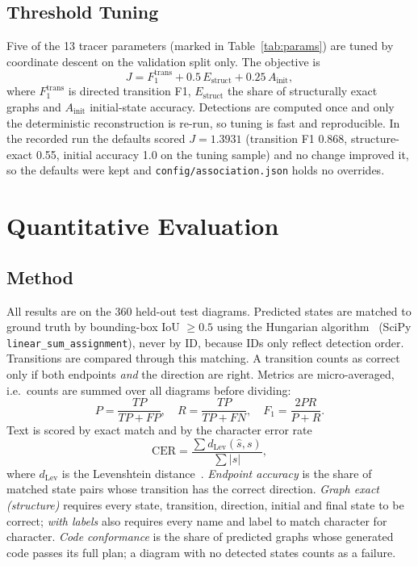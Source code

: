 \documentclass[journal,10pt]{IEEEtran}
\newcommand{\code}[1]{\texttt{#1}}
\begin{document}
\subsection{Threshold Tuning}
Five of the 13 tracer parameters (marked in Table~\ref{tab:params}) are tuned by coordinate
descent on the validation split only. The objective is
\begin{equation}
J = F_1^{\text{trans}} + 0.5\,E_{\text{struct}} + 0.25\,A_{\text{init}},
\end{equation}
where $F_1^{\text{trans}}$ is directed transition F1, $E_{\text{struct}}$ the share of
structurally exact graphs and $A_{\text{init}}$ initial-state accuracy. Detections are
computed once and only the deterministic reconstruction is re-run, so tuning is fast and
reproducible. In the recorded run the defaults scored $J=1.3931$ (transition F1 0.868,
structure-exact 0.55, initial accuracy 1.0 on the tuning sample) and no change improved
it, so the defaults were kept and \code{config/association.json} holds no overrides.

\section{Quantitative Evaluation}
\label{sec:results}

\subsection{Method}
All results are on the 360 held-out test diagrams. Predicted states are matched to ground
truth by bounding-box IoU $\ge 0.5$ using the Hungarian algorithm~\cite{kuhn} (SciPy
\code{linear\_sum\_assignment}), never by ID, because IDs only reflect detection order.
Transitions are compared through this matching. A transition counts as correct only if
both endpoints \emph{and} the direction are right. Metrics are micro-averaged, i.e.\
counts are summed over all diagrams before dividing:
\begin{equation}
P=\frac{TP}{TP+FP},\quad R=\frac{TP}{TP+FN},\quad F_1=\frac{2PR}{P+R}.
\end{equation}
Text is scored by exact match and by the character error rate
\begin{equation}
\text{CER}=\frac{\sum d_{\text{Lev}}(\hat{s}, s)}{\sum |s|},
\end{equation}
where $d_{\text{Lev}}$ is the Levenshtein distance~\cite{levenshtein}. \emph{Endpoint
accuracy} is the share of matched state pairs whose transition has the correct direction.
\emph{Graph exact (structure)} requires every state, transition, direction, initial and
final state to be correct; \emph{with labels} also requires every name and label to match
character for character. \emph{Code conformance} is the share of predicted graphs whose
generated code passes its full plan; a diagram with no detected states counts as a
failure.
\end{document}
